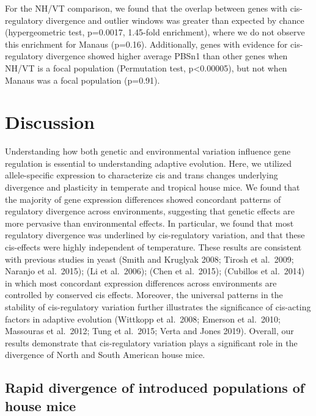 \documentclass[9pt,twocolumn,twoside,lineno]{pnas-new}
\begin{document}
For the NH/VT comparison, we found that the overlap between genes with
cis- regulatory divergence and outlier windows was greater than expected
by chance (hypergeometric test, p=0.0017, 1.45-fold enrichment), where
we do not observe this enrichment for Manaus (p=0.16). Additionally,
genes with evidence for cis- regulatory divergence showed higher average
PBSn1 than other genes when NH/VT is a focal population (Permutation
test, p\textless0.00005), but not when Manaus was a focal population
(p=0.91).

\hypertarget{discussion}{%
\section*{Discussion}\label{discussion}}

Understanding how both genetic and environmental variation influence
gene regulation is essential to understanding adaptive evolution. Here,
we utilized allele-specific expression to characterize cis and trans
changes underlying divergence and plasticity in temperate and tropical
house mice. We found that the majority of gene expression differences
showed concordant patterns of regulatory divergence across environments,
suggesting that genetic effects are more pervasive than environmental
effects. In particular, we found that most regulatory divergence was
underlined by cis-regulatory variation, and that these cis-effects were
highly independent of temperature. These results are consistent with
previous studies in yeast (Smith and Kruglyak 2008; Tirosh et al.~2009;
Naranjo et al.~2015); (Li et al.~2006); (Chen et al.~2015); (Cubillos et
al.~2014) in which most concordant expression differences across
environments are controlled by conserved cis effects. Moreover, the
universal patterns in the stability of cis-regulatory variation further
illustrates the significance of cis-acting factors in adaptive evolution
(Wittkopp et al.~2008; Emerson et al.~2010; Massouras et al.~2012; Tung
et al.~2015; Verta and Jones 2019). Overall, our results demonstrate
that cis-regulatory variation plays a significant role in the divergence
of North and South American house mice.

\hypertarget{rapid-divergence-of-introduced-populations-of-house-mice}{%
\subsection{Rapid divergence of introduced populations of house
mice}\label{rapid-divergence-of-introduced-populations-of-house-mice}}
\end{document}
